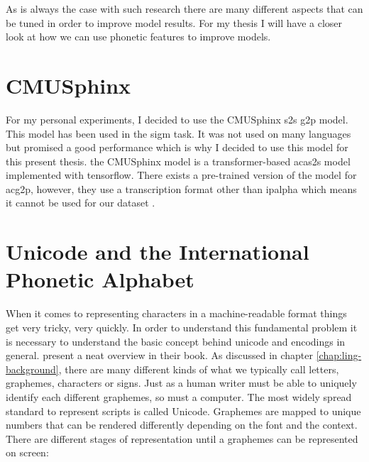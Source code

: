 As is always the case with such research there are many different aspects that can be tuned in order to improve model results. For my thesis I will have a closer look at how we can use phonetic features to improve models. 


\section{CMUSphinx}
\label{sec:cmu}
For my personal experiments, I decided to use the CMUSphinx \ac{s2s} \ac{g2p} model. This model has been used in the \ac{sigm} task. It was not used on many languages but promised a good performance which is why I decided to use this model for this present thesis. the CMUSphinx model is a transformer-based ac{as2s} model implemented with tensorflow. There exists a pre-trained version of the model for ac{g2p}, however, they use a transcription format other than \ac{ipalpha} which means it cannot be used for our dataset \citep{GitHub.03.02.2022}. 

\section{Unicode and the International Phonetic Alphabet}
\label{sec:unicode_ipa}
When it comes to representing characters in a machine-readable format things get very tricky, very quickly. In order to understand this fundamental problem it is necessary to understand the basic concept behind unicode and encodings in general. \citet{unicode-lingu} present a neat overview in their book. As discussed in chapter \ref{chap:ling-background}, there are many different kinds of what we typically call letters, graphemes, characters or signs. Just as a human writer must be able to uniquely identify each different graphemes, so must a computer. The most widely spread standard to represent scripts is called Unicode. Graphemes are mapped to unique numbers that can be rendered differently depending on the font and the context. There are different stages of representation until a graphemes can be represented on screen:

